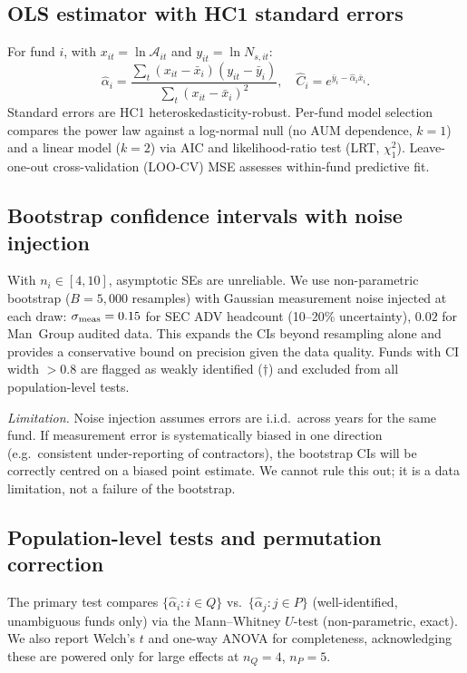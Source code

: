 \documentclass[12pt]{article}
\newcommand{\Ac}{\mathcal{A}}
\newcommand{\alphahat}{\hat{\alpha}}
\newcommand{\Chat}{\hat{C}}
\begin{document}
\subsection{OLS estimator with HC1 standard errors}

For fund $i$, with $x_{it} = \ln\Ac_{it}$ and
$y_{it} = \ln N_{s,it}$:
\begin{equation}
  \alphahat_i
    = \frac{\sum_t (x_{it}-\bar x_i)(y_{it}-\bar y_i)}
           {\sum_t (x_{it}-\bar x_i)^2},\quad
  \Chat_i = e^{\bar y_i - \alphahat_i \bar x_i}.
  \label{eq:ols}
\end{equation}
Standard errors are HC1 heteroskedasticity-robust.
Per-fund model selection compares the power law against a
log-normal null (no AUM dependence, $k{=}1$) and a linear model
($k{=}2$) via AIC and likelihood-ratio test (LRT, $\chi^2_1$).
Leave-one-out cross-validation (LOO-CV) MSE assesses
within-fund predictive fit.

\subsection{Bootstrap confidence intervals with noise injection}
\label{sec:bootstrap}

With $n_i \in [4,10]$, asymptotic SEs are unreliable.
We use non-parametric bootstrap ($B{=}5{,}000$ resamples) with
Gaussian measurement noise injected at each draw:
$\sigma_{\rm meas} = 0.15$ for SEC ADV headcount (10--20\%
uncertainty), $0.02$ for Man~Group audited data.
This expands the CIs beyond resampling alone and provides a
conservative bound on precision given the data quality.
Funds with CI width $> 0.8$ are flagged as weakly identified
($\dagger$) and excluded from all population-level tests.

\medskip\noindent\textit{Limitation.}
Noise injection assumes errors are i.i.d.\ across years for
the same fund.
If measurement error is systematically biased in one direction
(e.g.\ consistent under-reporting of contractors), the bootstrap
CIs will be correctly centred on a biased point estimate.
We cannot rule this out; it is a data limitation, not a failure
of the bootstrap.

\subsection{Population-level tests and permutation correction}
\label{sec:tests}

The primary test compares $\{\alphahat_i : i \in Q\}$ vs.\
$\{\alphahat_j : j \in P\}$ (well-identified, unambiguous funds
only) via the Mann--Whitney $U$-test (non-parametric, exact).
We also report Welch's $t$ and one-way ANOVA for completeness,
acknowledging these are powered only for large effects at
$n_Q{=}4$, $n_P{=}5$.
\end{document}
